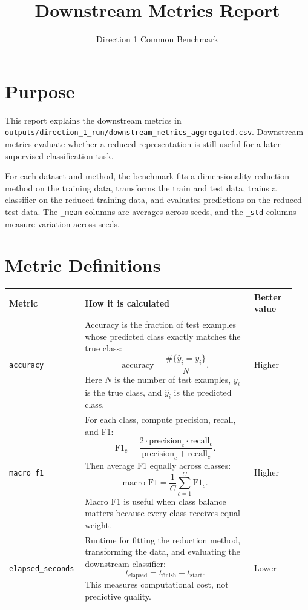 \documentclass[11pt]{article}
\title{Downstream Metrics Report}
\author{Direction 1 Common Benchmark}
\date{}
\begin{document}
\maketitle

\section{Purpose}

This report explains the downstream metrics in
\texttt{outputs/direction\_1\_run/downstream\_metrics\_aggregated.csv}.
Downstream metrics evaluate whether a reduced representation is still useful
for a later supervised classification task.

For each dataset and method, the benchmark fits a dimensionality-reduction
method on the training data, transforms the train and test data, trains a
classifier on the reduced training data, and evaluates predictions on the
reduced test data. The \texttt{\_mean} columns are averages across seeds, and
the \texttt{\_std} columns measure variation across seeds.

\section{Metric Definitions}

\begin{longtable}{p{0.22\linewidth} p{0.58\linewidth} p{0.14\linewidth}}
\toprule
\textbf{Metric} & \textbf{How it is calculated} & \textbf{Better value} \\
\midrule
\endhead

\texttt{accuracy}
&
Accuracy is the fraction of test examples whose predicted class exactly
matches the true class:
\[
\mathrm{accuracy} =
\frac{\#\{\hat{y}_i = y_i\}}{N}.
\]
Here $N$ is the number of test examples, $y_i$ is the true class, and
$\hat{y}_i$ is the predicted class.
&
Higher
\\
\addlinespace

\texttt{macro\_f1}
&
For each class, compute precision, recall, and F1:
\[
\mathrm{F1}_c =
\frac{2 \cdot \mathrm{precision}_c \cdot \mathrm{recall}_c}
{\mathrm{precision}_c + \mathrm{recall}_c}.
\]
Then average F1 equally across classes:
\[
\mathrm{macro\_F1} = \frac{1}{C}\sum_{c=1}^{C}\mathrm{F1}_c.
\]
Macro F1 is useful when class balance matters because every class receives
equal weight.
&
Higher
\\
\addlinespace

\texttt{elapsed\_seconds}
&
Runtime for fitting the reduction method, transforming the data, and evaluating
the downstream classifier:
\[
t_{\mathrm{elapsed}} = t_{\mathrm{finish}} - t_{\mathrm{start}}.
\]
This measures computational cost, not predictive quality.
&
Lower
\\

\bottomrule
\end{longtable}
\end{document}

